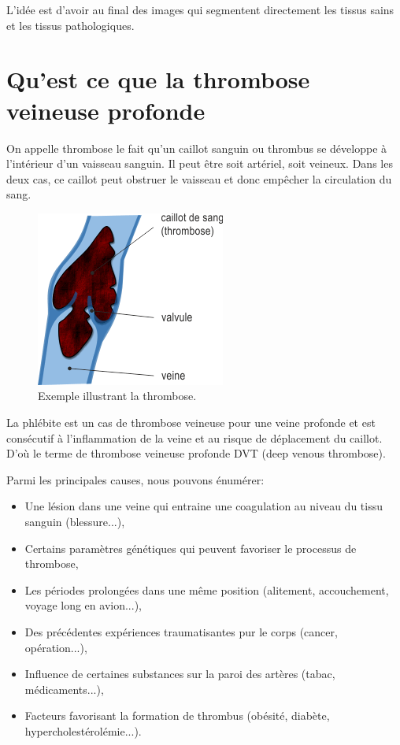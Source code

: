 L'idée est d'avoir au final des images qui segmentent directement les tissus sains et les tissus pathologiques.

\section{Qu'est ce que la thrombose veineuse profonde}

On appelle thrombose le fait qu'un caillot sanguin ou thrombus se développe à l'intérieur d'un vaisseau sanguin. Il peut être soit artériel, soit veineux. Dans les deux cas, ce caillot peut obstruer le vaisseau et donc empêcher la circulation du sang.

\begin{figure}[H]
\centering
    \includegraphics[scale=2,angle=0]{Images/phleb1.png}
    \caption{Exemple illustrant la thrombose.}
    \label{fig:phleb1}
\end{figure}

La phlébite est un cas de thrombose veineuse pour une veine profonde et est consécutif à l'inflammation de la veine et au risque de déplacement du caillot. D'où le terme de thrombose veineuse profonde DVT (deep venous thrombose).

Parmi les principales causes, nous pouvons énumérer:


\begin{itemize}
\item Une lésion dans une veine qui entraine une coagulation au niveau du tissu sanguin (blessure...),
\item Certains paramètres génétiques qui peuvent favoriser le processus de thrombose,
\item Les périodes prolongées dans une même position (alitement, accouchement, voyage long en avion...),
\item Des précédentes expériences traumatisantes pur le corps (cancer, opération...),
\item Influence de certaines substances sur la paroi des artères (tabac, médicaments...), 
\item Facteurs favorisant la formation de thrombus (obésité, diabète, hypercholestérolémie...). 
\end{itemize}

